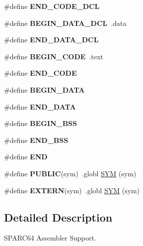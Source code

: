 \begin{DoxyCompactItemize}
\#define {\bfseries E\+N\+D\+\_\+\+C\+O\+D\+E\+\_\+\+D\+CL}
\item 
\mbox{\label{group__RTEMSScoreCPUSPARC64ASM_ga7f059077f76d2de57e245990dc6fdf25}} 
\#define {\bfseries B\+E\+G\+I\+N\+\_\+\+D\+A\+T\+A\+\_\+\+D\+CL}~.data
\item 
\mbox{\label{group__RTEMSScoreCPUSPARC64ASM_gaba5951c6a7df52e7c13d07a6823e9758}} 
\#define {\bfseries E\+N\+D\+\_\+\+D\+A\+T\+A\+\_\+\+D\+CL}
\item 
\mbox{\label{group__RTEMSScoreCPUSPARC64ASM_ga6d6dc213aff5b736968e2aff37eb2c99}} 
\#define {\bfseries B\+E\+G\+I\+N\+\_\+\+C\+O\+DE}~.text
\item 
\mbox{\label{group__RTEMSScoreCPUSPARC64ASM_gaac423acb743520558daf6a94e1e34534}} 
\#define {\bfseries E\+N\+D\+\_\+\+C\+O\+DE}
\item 
\mbox{\label{group__RTEMSScoreCPUSPARC64ASM_ga93fba2b033eb50ec004405c59faaa824}} 
\#define {\bfseries B\+E\+G\+I\+N\+\_\+\+D\+A\+TA}
\item 
\mbox{\label{group__RTEMSScoreCPUSPARC64ASM_gab989978585b78e98ff314e8abb5f9bb0}} 
\#define {\bfseries E\+N\+D\+\_\+\+D\+A\+TA}
\item 
\mbox{\label{group__RTEMSScoreCPUSPARC64ASM_ga50f110f0489e48ceda4a0473a35d2978}} 
\#define {\bfseries B\+E\+G\+I\+N\+\_\+\+B\+SS}
\item 
\mbox{\label{group__RTEMSScoreCPUSPARC64ASM_gae8acdd1ba8aa625ce8a829773fd512e2}} 
\#define {\bfseries E\+N\+D\+\_\+\+B\+SS}
\item 
\mbox{\label{group__RTEMSScoreCPUSPARC64ASM_ga29fd18bed01c4d836c7ebfe73a125c3f}} 
\#define {\bfseries E\+ND}
\item 
\mbox{\label{group__RTEMSScoreCPUSPARC64ASM_ga5e536c0e80cb78da6a74541281111e40}} 
\#define {\bfseries P\+U\+B\+L\+IC}(sym)~.globl \mbox{\hyperlink{group__RTEMSScoreCPUx86-64ASM_gafe05d428a5f345f51fb591debb815325}{S\+YM}} (sym)
\item 
\mbox{\label{group__RTEMSScoreCPUSPARC64ASM_ga9808b867f8d1bd54d78548a5cd5dc415}} 
\#define {\bfseries E\+X\+T\+E\+RN}(sym)~.globl \mbox{\hyperlink{group__RTEMSScoreCPUx86-64ASM_gafe05d428a5f345f51fb591debb815325}{S\+YM}} (sym)
\end{DoxyCompactItemize}


\subsection{Detailed Description}
S\+P\+A\+R\+C64 Assembler Support. 

